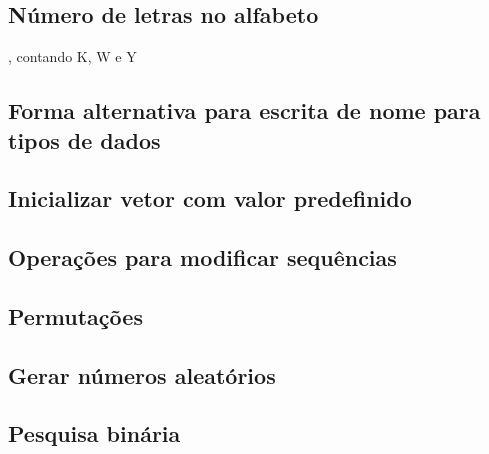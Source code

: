 \documentclass[a4paper,12pt]{article}
\begin{document}
\subsection{Número de letras no alfabeto}
, contando K, W e Y

\subsection{Forma alternativa para escrita de nome para tipos de dados}

\subsection{Inicializar vetor com valor predefinido}

\subsection{Operações para modificar sequências}

\subsection{Permutações}

\subsection{Gerar números aleatórios}

\subsection{Pesquisa binária}
\end{document}
